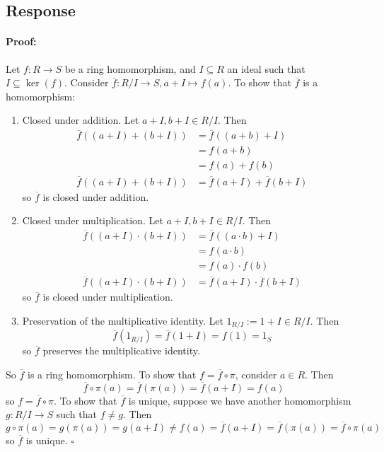 \documentclass [12pt] {article}
\newenvironment{proof}{\paragraph{Proof:}}{\hfill$\square$}
\begin{document}
\subsection*{Response}
\begin{proof}
    Let $f : R \to S$ be a ring homomorphism, and $I \subseteq R$ an ideal such that 
    $I \subseteq \ker(f)$. Consider $\overline{f} : R/I \to S, a + I \mapsto f(a)$. To show that
    $\overline{f}$ is a homomorphism:
    \begin{enumerate}
        \item Closed under addition. Let $a + I, b + I \in R/I$. Then
            \begin{align*}
                \overline{f}((a + I) + (b + I)) 
                &= \overline{f}((a + b) + I)  \\
                &= f(a + b) \\
                &= f(a) + f(b) \\ 
                \overline{f}((a + I) + (b + I)) 
                &= \overline{f}(a + I) + \overline{f}(b + I)
            \end{align*}
            so $\overline{f}$ is closed under addition.
        \item Closed under multiplication. Let $a + I, b + I \in R/I$. Then
            \begin{align*}
                \overline{f}((a + I) \cdot (b + I)) 
                &= \overline{f}((a \cdot b) + I)  \\
                &= f(a \cdot b) \\
                &= f(a) \cdot f(b) \\ 
                \overline{f}((a + I) \cdot (b + I)) 
                &= \overline{f}(a + I) \cdot \overline{f}(b + I)
            \end{align*}
            so $\overline{f}$ is closed under multiplication.
        \item Preservation of the multiplicative identity. Let $1_{R/I} := 1 + I \in R/I$. Then
            \[\overline{f}(1_{R/I}) = \overline{f}(1 + I) = f(1) = 1_S\]
            so $\overline{f}$ preserves the multiplicative identity.
    \end{enumerate}
    So $\overline{f}$ is a ring homomorphism. To show that $f = \overline{f} \circ \pi$, consider
    $a \in R$. Then
    \[\overline{f} \circ \pi (a) = \overline{f}(\pi(a)) = \overline{f}(a + I) = f(a)\]
    so $f = \overline{f} \circ \pi$. To show that $\overline{f}$ is unique, suppose we have another
    homomorphism $g : R/I \to S$ such that $f \neq g$. Then
    \[
        g \circ \pi (a) = g(\pi(a)) = g(a + I) 
        \neq f(a) 
        = \overline{f}(a + I) = \overline{f}(\pi(a)) = \overline{f} \circ \pi (a)
    \]
    so $\overline{f}$ is unique.
\end{proof}
\newpage
\end{document}
